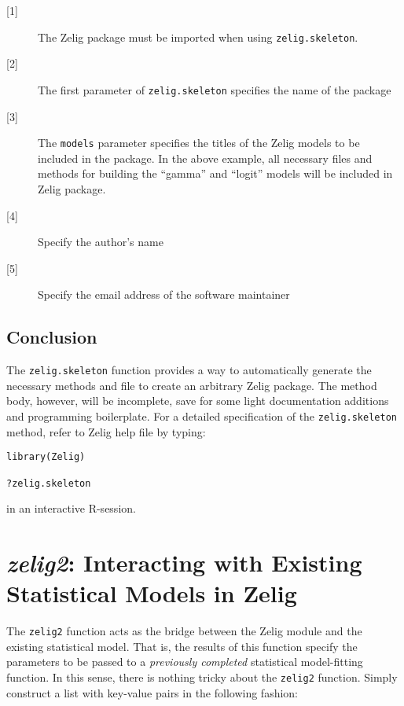 \documentclass{article}
\newcommand{\code}[1]{{\tt #1}}
\begin{document}
\begin{description}

	\item[{[1]}] The Zelig package must be imported when using \code{zelig.skeleton}.

	\item[{[2]}] The first parameter of \code{zelig.skeleton} specifies the name of the package

	\item[{[3]}] The \code{models} parameter specifies the titles of the Zelig models to be included in the package. In the above example, all necessary files and methods for building the ``gamma'' and ``logit'' models will be included in Zelig package.

	\item[{[4]}] Specify the author's name

	\item[{[5]}] Specify the email address of the software maintainer

\end{description}

\subsection{Conclusion}

The \code{zelig.skeleton} function provides a way to automatically generate the necessary methods and file to create an arbitrary Zelig package. The method body, however, will be incomplete, save for some light documentation additions and programming boilerplate. For a detailed specification of the \code{zelig.skeleton} method, refer to Zelig help file by typing:

\begin{verbatim}
library(Zelig)

?zelig.skeleton
\end{verbatim}

{\noindent}in an interactive R-session.
 

\section{\emph{zelig2}: Interacting with Existing Statistical Models in Zelig}
\label{section:zelig2}

The \code{zelig2} function acts as the bridge between the Zelig module and the existing statistical model. That is, the results of this function specify the parameters to be passed to a \emph{previously completed} statistical model-fitting function. In this sense, there is nothing tricky about the \code{zelig2} function. Simply construct a list with key-value pairs in the following fashion:
\end{document}
